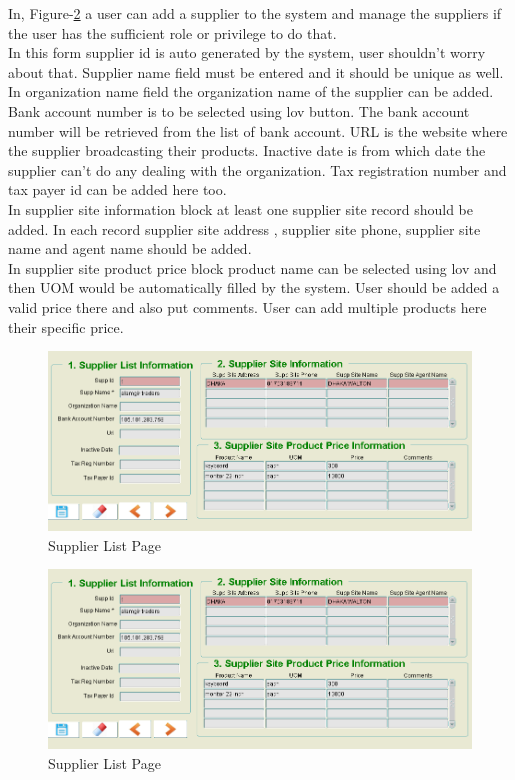 \documentclass[12pt]{report} %
\begin{document}
In, Figure-\ref{fig:supplier_list_page} a user can add a supplier to the system and manage the suppliers if the user has the sufficient role or privilege to do that. \\
In this form supplier id is auto generated by the system, user shouldn't worry about that. Supplier name field must be entered and it should be unique as well. In organization name field the organization name of the supplier can be added. Bank account number is to be selected using lov button. The bank account number will be retrieved from the list of bank account. URL is the website where the supplier broadcasting their products. Inactive date is from which date the supplier can't do any dealing with the organization. Tax registration number and tax payer id can be added here too.\\
In supplier site information block at least one supplier site record should be added. In each record supplier site address , supplier site phone, supplier site name and agent name should be added.\\
In supplier site product price block product name can be selected using lov and then UOM would be automatically filled by the system. User should be added a valid price there and also put comments. User can add multiple products here their specific price.

\begin{figure}[h]
	\begin{center}
		\includegraphics[width=1\textwidth]{pic/supplier_list_page.PNG}
	\end{center}
	\caption{Supplier List Page}
	\label{fig:supplier_list_page}
\end{figure}


\ifx

\begin{figure}[h]
	\includegraphics[width=1\textwidth]{pic/supplier_list_page.PNG}
	\caption{Supplier List Page}
	\label{fig:supplier_list_page}
\end{figure}
\clearpage
\end{document}
